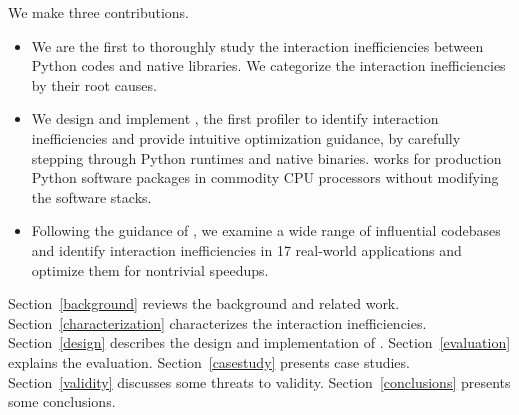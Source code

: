 \begin{comment}
\paragraph{Scope.}
First, we target only interaction inefficiencies between Python codes and native libraries, and measuring inefficiencies in pure Python or pure native codes is out of the scope. Second, we design \tool{} as a dynamic profiler that pinpoints inefficiencies in codes, but it is the responsibility of human programmers to investigate the profilers and optimize the codes. Third, \tool{} is input dependent; to ensure that it produces representative profiles, we recommend using typical inputs to study the given Python application. 
\end{comment}

We make three contributions.
\begin{itemize}
\item We are the first to thoroughly study the interaction inefficiencies between Python codes and native libraries. We categorize the interaction inefficiencies by their root causes.

\item We design and implement \tool, the first profiler to identify interaction inefficiencies and provide intuitive optimization guidance, by carefully stepping through Python runtimes and native binaries. \tool works for production Python software packages in commodity CPU processors without modifying the software stacks.

\item Following the guidance of \tool, we examine a wide range of influential codebases and identify interaction inefficiencies in 17 real-world applications and optimize them for nontrivial speedups.
\end{itemize}



Section~\ref{background} reviews the background and related work. Section~\ref{characterization} characterizes the interaction inefficiencies. Section~\ref{design} describes the design and implementation of \tool. Section~\ref{evaluation} explains the evaluation. Section~\ref{casestudy} presents case studies. Section~\ref{validity} discusses some threats to validity. Section~\ref{conclusions} presents some conclusions. 
 






